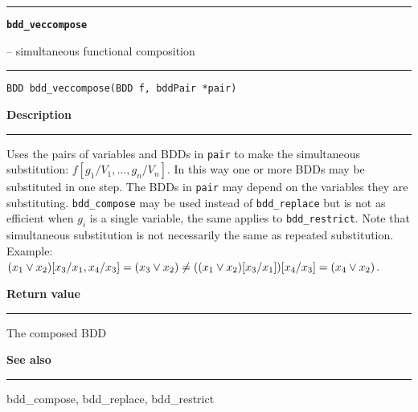 \begin{minipage}{\textwidth}

\noindent\begin{minipage}{\textwidth}
\rule{\textwidth}{0.5mm}
{\tt\bf bdd\_veccompose }
\--- simultaneous functional composition  \hspace{\fill}
\\\rule[1.5ex]{\textwidth}{0.5mm}
\end{minipage}

\noindent\begin{verbatim}
BDD bdd_veccompose(BDD f, bddPair *pair) 
\end{verbatim}

\vspace{\parsep}\noindent
{\bf Description}\\\rule[1.5ex]{\textwidth}{0.2mm}\vspace{-1.5ex}\setlength{\parindent}{1em}
Uses the pairs of variables and BDDs in {\tt pair} to make
           the simultaneous substitution: $f[g_1/V_1, \ldots, g_n/V_n]$.
	   In this way one or more BDDs
	   may be substituted in one step. The BDDs in
	   {\tt pair} may depend on the variables they are substituting.
           {\tt bdd\_compose} may be used instead of
	   {\tt bdd\_replace} but is not as efficient when $g_i$ is a
	   single variable, the same applies to {\tt bdd\_restrict}.
	   Note that simultaneous substitution is not necessarily the same
	   as repeated substitution. Example:
	   $(x_1 \vee x_2)[x_3/x_1,x_4/x_3] = (x_3 \vee x_2) \neq
	   ((x_1 \vee x_2)[x_3/x_1])[x_4/x_3] = (x_4 \vee x_2)$. 

\setlength{\parindent}{0em}\vspace{\parsep}\vspace{\baselineskip}\noindent
{\bf Return value}\\\rule[1.5ex]{\textwidth}{0.2mm}\vspace{-1.5ex}
The composed BDD 

\vspace{\parsep}\vspace{\baselineskip}\noindent
{\bf See also}\\\rule[1.5ex]{\textwidth}{0.2mm}\vspace{-1.5ex}
bdd\_compose, bdd\_replace, bdd\_restrict 
\end{minipage}
\vspace{8ex}
